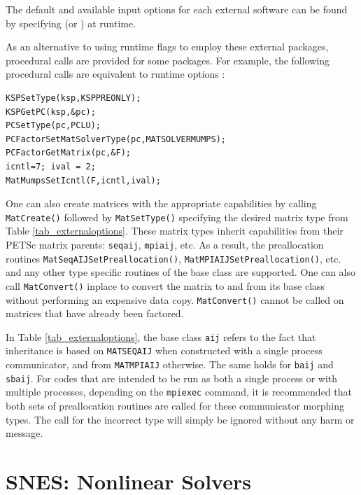 The default and available input options for each external software can be found
by specifying  (or ) at runtime.

As an alternative to using runtime flags to employ these external
packages,
procedural calls are provided for some packages. For example, the following procedural calls
are equivalent to runtime options
   :
\begin{lstlisting}
KSPSetType(ksp,KSPPREONLY);
KSPGetPC(ksp,&pc);
PCSetType(pc,PCLU);
PCFactorSetMatSolverType(pc,MATSOLVERMUMPS);
PCFactorGetMatrix(pc,&F);
icntl=7; ival = 2;
MatMumpsSetIcntl(F,icntl,ival);
\end{lstlisting}

One can also create matrices with the appropriate
capabilities by calling \lstinline{MatCreate()} followed by \lstinline{MatSetType()}
specifying the desired matrix type from Table \ref{tab_externaloptions}.
These matrix types inherit capabilities from their PETSc matrix
parents: \lstinline{seqaij}, \lstinline{mpiaij}, etc.  As a result, the preallocation routines
\lstinline{MatSeqAIJSetPreallocation()}, \lstinline{MatMPIAIJSetPreallocation()}, etc. and any other type
specific routines of the base class are supported.  One can also
call \lstinline{MatConvert()} inplace to convert the matrix to and from its base
class without performing an expensive data copy.  \lstinline{MatConvert()} cannot be
called on matrices that have already been factored.

In Table \ref{tab_externaloptions}, the base class \lstinline{aij} refers to the fact
that inheritance is based on \lstinline{MATSEQAIJ} when constructed with a single
process communicator, and from \lstinline{MATMPIAIJ} otherwise.  The same holds
for \lstinline{baij} and \lstinline{sbaij}.  For codes that are intended to be run as both a
single process or with multiple processes, depending on the \lstinline{mpiexec}
command, it is recommended that both sets of preallocation routines
are called for these communicator morphing types.  The call for the
incorrect type will simply be ignored without any harm or message.

\cleardoublepage
\chapter{SNES: Nonlinear Solvers}
\label{chapter_snes}


